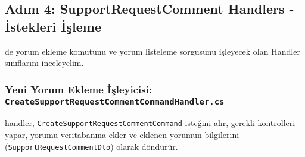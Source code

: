 \documentclass[11pt, a4paper]{article}
\begin{document}
\subsection{Adım 4: SupportRequestComment Handlers - İstekleri İşleme}
 de yorum ekleme komutunu ve yorum listeleme sorgusunu işleyecek olan Handler sınıflarını inceleyelim.

\subsubsection{Yeni Yorum Ekleme İşleyicisi: \texttt{CreateSupportRequestCommentCommandHandler.cs}}
\nBu handler, \texttt{CreateSupportRequestCommentCommand} isteğini alır, gerekli kontrolleri yapar, yorumu veritabanına ekler ve eklenen yorumun bilgilerini (\texttt{SupportRequestCommentDto}) olarak döndürür.
\end{document}
